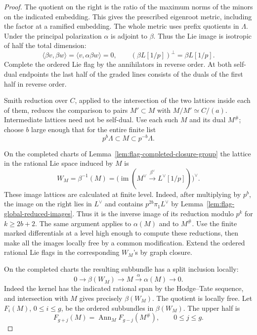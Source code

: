 \begin{proof}
The quotient on the right is the ratio of the maximum norms of
the minors on the indicated embedding. This gives the prescribed
eigenroot metric, including the factor at a ramified embedding.
The whole metric uses prefix quotients in \(\Lambda\).
Under the principal polarization \(\alpha\) is adjoint to \(\beta\).
Thus the Lie image is isotropic of half the total dimension:
\[
    \langle \beta v,\beta w\rangle
      =\langle v,\alpha\beta w\rangle=0,\qquad
    (\beta L[1/p])^\perp=\beta L[1/p].
\]
Complete the ordered Lie flag by the annihilators in reverse order.
At both self-dual endpoints the last half of the graded lines
consists of the duals of the first half in reverse order.

Smith reduction over \(C\), applied to the intersection of the two
lattices inside each of them, reduces the comparison to pairs
\(M'\subset M\) with \(M/M'\simeq C/(a)\). Intermediate lattices
need not be self-dual. Use each such \(M\) and its dual \(M^\#\);
choose \(b\) large enough that for the entire finite list
\[
                p^b\Lambda\subset M\subset p^{-b}\Lambda .
\]

On the completed charts of Lemma~\ref{lem:flag-completed-closure-group}
the lattice in the rational Lie space induced by \(M\) is
\[
 W_M=\beta^{-1}(M)
     =\bigl(\operatorname{im}(M^\vee\xrightarrow{\beta^\vee}
                                       L^\vee[1/p])\bigr)^\vee .
\]
These image lattices are calculated at finite level. Indeed, after
multiplying by \(p^b\), the image on the right lies in \(L^\vee\)
and contains \(p^{2b}\pi_1L^\vee\) by
Lemma~\ref{lem:flag-global-reduced-images}. Thus it is the inverse
image of its reduction modulo \(p^k\) for \(k\ge 2b+2\). The same
argument applies to \(\alpha(M)\) and to \(M^\#\). Use the finite
marked differentials at a level high enough to compute these
reductions, then make all the images locally free by a common
modification. Extend the ordered rational Lie flags in the
corresponding \(W_M\)'s by graph closure.

On the completed charts the resulting subbundle has a split
inclusion locally:
\[
   0\longrightarrow \beta(W_M)\longrightarrow M
                       \xrightarrow{\alpha}\alpha(M)\longrightarrow0 .
\]
Indeed the kernel has the indicated rational span by the Hodge--Tate
sequence, and intersection with \(M\) gives precisely \(\beta(W_M)\).
The quotient is locally free. Let \(F_i(M)\), \(0\le i\le g\),
be the ordered subbundles in \(\beta(W_M)\). The upper half is
\[
    F_{g+j}(M)=\operatorname{Ann}_M F_{g-j}(M^\#),
                           \qquad 0\le j\le g .
\]


\end{proof}
